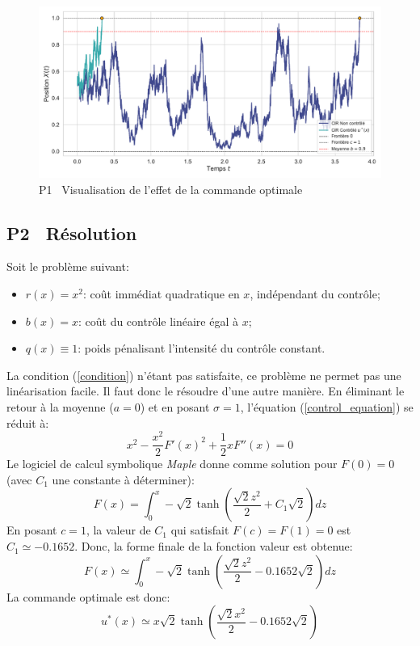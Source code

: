 \begin{figure}[htb]
    \centering
    \includegraphics[width=0.9\linewidth]{img/validation/P1/p1_control_simulation.pdf}
    \caption{P1 \textemdash~Visualisation de l'effet de la commande optimale}\label{fig:Simulation1}
\end{figure}\FloatBarrier\subsection{P2 \textemdash~Résolution}\label{p3}
Soit le problème suivant:
\begin{itemize}
    \item $r(x) = x^2$: coût immédiat quadratique en $x$, indépendant du contrôle;
    \item $b(x) = x$: coût du contrôle linéaire égal à $x$;
    \item $q(x) \equiv 1$: poids pénalisant l'intensité du contrôle constant.
\end{itemize}
La condition (\ref{condition}) n'étant pas satisfaite, ce problème ne permet pas une linéarisation facile. Il faut donc le résoudre d'une autre manière. En éliminant le retour à la moyenne ($a=0$) et en posant $\sigma=1$, l'équation (\ref{control_equation}) se réduit à:
\begin{equation}\label{reduced_control_equation}
    x^2-\frac{x^2}{2}{F'(x)}^2+\frac{1}{2}xF''(x)=0
\end{equation}
Le logiciel de calcul symbolique \textit{Maple} donne comme solution pour $F(0)=0$ (avec $C_1$ une constante à déterminer):
\[
    F(x)=\int_0^x-\sqrt{2}\tanh\left(\frac{\sqrt{2}z^2}{2}+C_1\sqrt{2}\right)dz
\]
En posant $c=1$, la valeur de $C_1$ qui satisfait $F(c)=F(1)=0$ est $C_1\simeq -0.1652$. Donc, la forme finale de la fonction valeur est obtenue:
\begin{equation}\label{sol_control_3}
    F(x)\simeq \int_0^x-\sqrt{2}\tanh\left(\frac{\sqrt{2}z^2}{2}-0.1652\sqrt{2}\right)dz
\end{equation}
La commande optimale est donc:
\begin{equation}\label{optimal_control_3}
    u^*(x)\simeq x\sqrt{2}\tanh\left(\frac{\sqrt{2}x^2}{2}-0.1652\sqrt{2}\right)
\end{equation}
